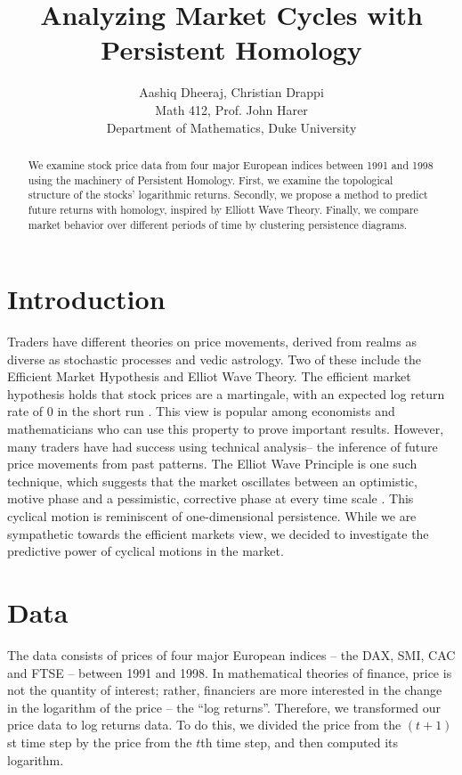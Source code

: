 \documentclass{article}
\title{Analyzing Market Cycles with Persistent Homology}
\author{
Aashiq Dheeraj, Christian Drappi \\
Math 412, Prof. John Harer \\
Department of Mathematics, Duke University
}
\begin{document}
\large

\maketitle

\begin{abstract}
We examine stock price data from four major European indices between 1991 and 1998 using the machinery of Persistent Homology. First, we examine the topological structure of the stocks’ logarithmic returns. Secondly, we propose a method to predict future returns with homology, inspired by Elliott Wave Theory. Finally, we compare market behavior over different periods of time by clustering persistence diagrams.
\end{abstract}

\newpage

\section{Introduction}
Traders have different theories on price movements, derived from realms as diverse as stochastic processes and vedic astrology. Two of these include the Efficient Market Hypothesis and Elliot Wave Theory. The efficient market hypothesis holds that stock prices are a martingale, with an expected log return rate of 0 in the short run \cite{samuelson1965}. This view is popular among economists and mathematicians who can use this property to prove important results. However, many traders have had success using technical analysis-- the inference of future price movements from past patterns. The Elliot Wave Principle is one such technique, which suggests that the market oscillates between an optimistic, motive phase and a pessimistic, corrective phase at every time scale \cite{frost2005}. This cyclical motion is reminiscent of one-dimensional persistence. While we are sympathetic towards the efficient markets view, we decided to investigate the predictive power of cyclical motions in the market. 


\section{Data}
The data consists of prices of four major European indices – the DAX, SMI, CAC and FTSE – between 1991 and 1998. In mathematical theories of finance, price is not the quantity of interest; rather, financiers are more interested in the change in the logarithm of the price – the “log returns”. Therefore, we transformed our price data to log returns data. To do this, we divided the price from the $(t+1)$st time step by the price from the $t$th time step, and then computed its logarithm.
\end{document}
